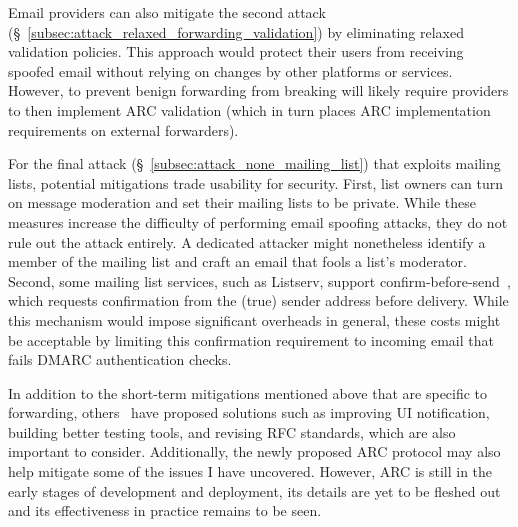 Email providers can also mitigate the second attack (\S~\ref{subsec:attack_relaxed_forwarding_validation}) by eliminating
relaxed validation policies.  This approach would protect their users
from receiving spoofed email without relying on changes by other
platforms or services.  However, to prevent benign forwarding from
breaking will likely require providers to then implement ARC
validation (which in turn places ARC implementation requirements on
external forwarders).


For the final attack (\S~\ref{subsec:attack_none_mailing_list}) that exploits mailing lists, potential mitigations trade usability for security.
First, list owners can turn on message moderation and set their mailing lists to be private.
While these measures increase the difficulty of performing email spoofing attacks, they do not rule out the attack entirely. A dedicated attacker might
nonetheless identify a member of the mailing list and craft an email
that fools a list's moderator.
Second, some mailing list services, such as Listserv, support confirm-before-send~\cite{OnmyLIST7:online}, which requests confirmation from the (true) sender address before delivery.  While this mechanism would impose significant overheads in general, these costs might be acceptable by limiting this confirmation requirement to incoming email that fails DMARC authentication checks.

In addition to the short-term mitigations mentioned above that are
specific to forwarding, others~\cite{chen2020composition,shen2020weak}
have proposed solutions such as improving UI notification, building
better testing tools, and revising RFC standards, which are also
important to consider. Additionally, the newly proposed ARC protocol
may also help mitigate some of the issues I have uncovered. However,
ARC is still in the early stages of development and deployment, 
its details are yet to be fleshed out and its effectiveness in
practice remains to be seen.

